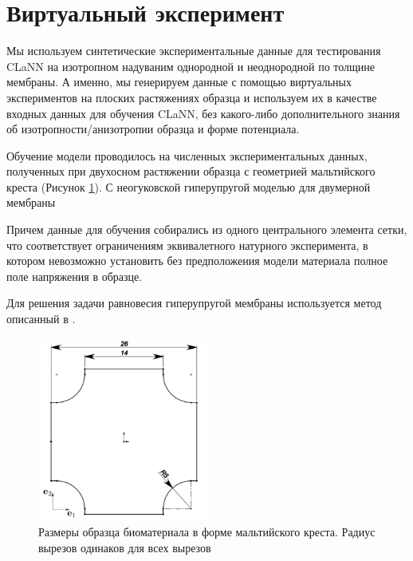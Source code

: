 \section{Виртуальный эксперимент}

Мы используем синтетические экспериментальные данные для тестирования CLaNN 
на изотропном надуваним однородной и неоднородной по толщине мембраны. 
А именно, мы генерируем данные с помощью виртуальных экспериментов на плоских растяжениях образца и используем их в качестве входных данных для 
обучения CLaNN, без какого-либо дополнительного знания об изотропности/анизотропии образца и форме потенциала.
 
Обучение модели проводилось на численных экспериментальных данных, 
полученных при двухосном растяжении образца с геометрией мальтийского креста (Рисунок \ref{fig:malt_geometry}).
С неогуковской гиперупругой моделью для двумерной мембраны \cite{ogden1997nonlinear}

Причем данные для обучения собирались из одного центрального элемента сетки, что соответствует ограничениям эквивалетного 
натурного эксперимента, в котором невозможно установить без предположения модели материала полное поле напряжения в образце.

Для решения задачи равновесия гиперупругой мембраны используется метод описанный в \cite{ddaniso2024}.

\begin{figure}[H]
  \centering
  \includegraphics[width=0.5\textwidth]{img/malt_geom.png}
  \caption{Размеры образца биоматериала в форме мальтийского креста. 
  Радиус вырезов одинаков для всех вырезов}
  \label{fig:malt_geometry}
\end{figure}

